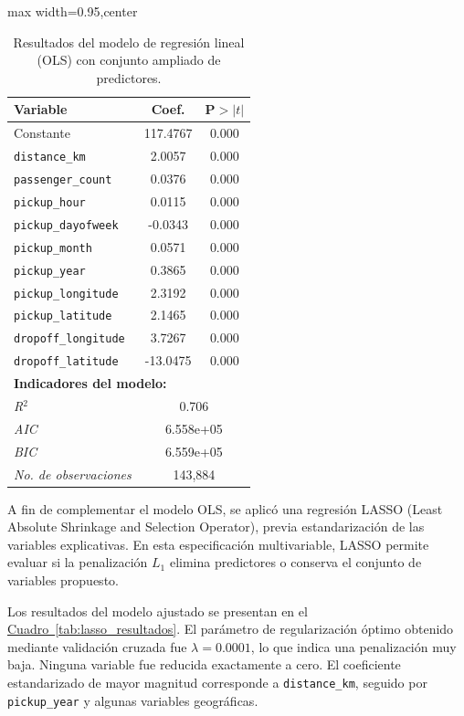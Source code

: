 \documentclass[10pt]{article}
\newcommand{\cuadroref}[1]{\hyperref[#1]{Cuadro~\ref*{#1}}}
\begin{document}
	\begin{table}[!htbp]
		\centering
		\caption{Resultados del modelo de regresión lineal (OLS) con conjunto ampliado de predictores.}
		\label{tab:ols_resultados}
		\begin{adjustbox}{max width=0.95\textwidth,center}
			\begin{tabular}{lcc}
				\hline
				\textbf{Variable} & \textbf{Coef.} & \textbf{P$>|t|$} \\
				\hline
				Constante & 117.4767 & 0.000 \\
				\texttt{distance\_km} & 2.0057 & 0.000 \\
				\texttt{passenger\_count} & 0.0376 & 0.000 \\
				\texttt{pickup\_hour} & 0.0115 & 0.000 \\
				\texttt{pickup\_dayofweek} & -0.0343 & 0.000 \\
				\texttt{pickup\_month} & 0.0571 & 0.000 \\
				\texttt{pickup\_year} & 0.3865 & 0.000 \\
				\texttt{pickup\_longitude} & 2.3192 & 0.000 \\
				\texttt{pickup\_latitude} & 2.1465 & 0.000 \\
				\texttt{dropoff\_longitude} & 3.7267 & 0.000 \\
				\texttt{dropoff\_latitude} & -13.0475 & 0.000 \\
				\hline
				\multicolumn{3}{l}{\textbf{Indicadores del modelo:}} \\
				\hline
				\textit{R$^2$} & \multicolumn{2}{c}{0.706} \\
				\textit{AIC} & \multicolumn{2}{c}{6.558e+05} \\
				\textit{BIC} & \multicolumn{2}{c}{6.559e+05} \\
				\textit{No. de observaciones} & \multicolumn{2}{c}{143{,}884} \\
				\hline
			\end{tabular}
		\end{adjustbox}
	\end{table}

	A fin de complementar el modelo OLS, se aplicó una regresión LASSO (Least Absolute Shrinkage and Selection Operator), previa estandarización de las variables explicativas. En esta especificación multivariable, LASSO permite evaluar si la penalización $L_1$ elimina predictores o conserva el conjunto de variables propuesto.

	Los resultados del modelo ajustado se presentan en el \cuadroref{tab:lasso_resultados}. El parámetro de regularización óptimo obtenido mediante validación cruzada fue $\lambda = 0.0001$, lo que indica una penalización muy baja. Ninguna variable fue reducida exactamente a cero. El coeficiente estandarizado de mayor magnitud corresponde a \texttt{distance\_km}, seguido por \texttt{pickup\_year} y algunas variables geográficas.
\end{document}
